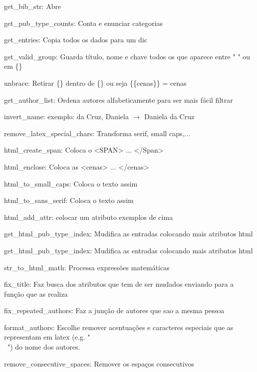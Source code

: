 \documentclass[11pt,a4paper]{report}
\begin{document}
\begin{enumerate*}[label=\textbf{L\arabic*}]
    \item \label{L1}get\_bib\_str: Abre \bib
    \item \label{L2}get\_pub\_type\_counts: Conta e enunciar categorias
    \item \label{L3}get\_entries: Copia todos os dados \bib para um dic
    \item \label{L4}get\_valid\_group: Guarda título, nome e chave todos os que aparece entre " " ou em \{\}
    \item \label{L5}unbrace: Retirar \{\} dentro de \{\} ou seja \{\{cenas\}\} = cenas
    \item \label{L6}get\_author\_list: Ordena autores alfabeticamente para ser mais fácil filtrar
    \item \label{L7}invert\_name: exemplo: da Cruz, Daniela $\rightarrow$ Daniela da Cruz
    \item \label{L8}remove\_latex\_special\_chars: Transforma serif, small caps,... 
    \item \label{L9}html\_create\_span: Coloca o <SPAN> ... </Span>
    \item \label{L10}html\_enclose:  Coloca as <cenas> ... </cenas>
    \item \label{L11}html\_to\_small\_caps: Coloca o texto assim
    \item \label{L12}html\_to\_sans\_serif: Coloca o texto assim
    \item \label{L13}html\_add\_attr: colocar um atributo exemplos de cima
    \item \label{L14}get\_html\_pub\_type\_index: Mudifica as entradas colocando mais atributos html
    \item \label{L15}get\_html\_pub\_type\_index: Mudifica as entradas colocando mais atributos html
    \item \label{L16}str\_to\_html\_math: Processa expressões matemáticas
    \item \label{L17}fix\_title: Faz busca dos atributos que tem de ser mudados enviando para a função que as realiza
    \item \label{L18}fix\_repeated\_authors: Faz a junção de autores que sao a mesma pessoa
    \item \label{L19}format\_authors: Escolhe remover acentuações e caracteres especiais  que as representam em latex (e.g. "\\~") do nome dos autores.
    \item \label{L20}remove\_consecutive\_spaces: Remover os espaços consecutivos 

\end{enumerate*}
\end{document}

